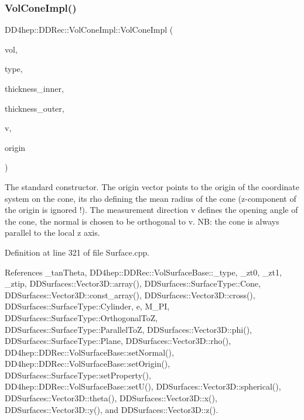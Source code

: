 \subsubsection{\texorpdfstring{Vol\+Cone\+Impl()}{VolConeImpl()}\hspace{0.1cm}{\footnotesize\ttfamily [2/2]}}
{\footnotesize\ttfamily D\+D4hep\+::\+D\+D\+Rec\+::\+Vol\+Cone\+Impl\+::\+Vol\+Cone\+Impl (\begin{DoxyParamCaption}\item[{\hyperlink{class_d_d4hep_1_1_geometry_1_1_volume}{Geometry\+::\+Volume}}]{vol,  }\item[{\hyperlink{class_d_d_surfaces_1_1_surface_type}{Surface\+Type}}]{type,  }\item[{double}]{thickness\+\_\+inner,  }\item[{double}]{thickness\+\_\+outer,  }\item[{\hyperlink{class_d_d_surfaces_1_1_vector3_d}{Vector3D}}]{v,  }\item[{\hyperlink{class_d_d_surfaces_1_1_vector3_d}{Vector3D}}]{origin }\end{DoxyParamCaption})}

The standard constructor. The origin vector points to the origin of the coordinate system on the cone, its rho defining the mean radius of the cone (z-\/component of the origin is ignored !). The measurement direction v defines the opening angle of the cone, the normal is chosen to be orthogonal to v. NB\+: the cone is always parallel to the local z axis. 

Definition at line 321 of file Surface.\+cpp.



References \+\_\+tan\+Theta, D\+D4hep\+::\+D\+D\+Rec\+::\+Vol\+Surface\+Base\+::\+\_\+type, \+\_\+zt0, \+\_\+zt1, \+\_\+ztip, D\+D\+Surfaces\+::\+Vector3\+D\+::array(), D\+D\+Surfaces\+::\+Surface\+Type\+::\+Cone, D\+D\+Surfaces\+::\+Vector3\+D\+::const\+\_\+array(), D\+D\+Surfaces\+::\+Vector3\+D\+::cross(), D\+D\+Surfaces\+::\+Surface\+Type\+::\+Cylinder, e, M\+\_\+\+PI, D\+D\+Surfaces\+::\+Surface\+Type\+::\+Orthogonal\+ToZ, D\+D\+Surfaces\+::\+Surface\+Type\+::\+Parallel\+ToZ, D\+D\+Surfaces\+::\+Vector3\+D\+::phi(), D\+D\+Surfaces\+::\+Surface\+Type\+::\+Plane, D\+D\+Surfaces\+::\+Vector3\+D\+::rho(), D\+D4hep\+::\+D\+D\+Rec\+::\+Vol\+Surface\+Base\+::set\+Normal(), D\+D4hep\+::\+D\+D\+Rec\+::\+Vol\+Surface\+Base\+::set\+Origin(), D\+D\+Surfaces\+::\+Surface\+Type\+::set\+Property(), D\+D4hep\+::\+D\+D\+Rec\+::\+Vol\+Surface\+Base\+::set\+U(), D\+D\+Surfaces\+::\+Vector3\+D\+::spherical(), D\+D\+Surfaces\+::\+Vector3\+D\+::theta(), D\+D\+Surfaces\+::\+Vector3\+D\+::x(), D\+D\+Surfaces\+::\+Vector3\+D\+::y(), and D\+D\+Surfaces\+::\+Vector3\+D\+::z().



